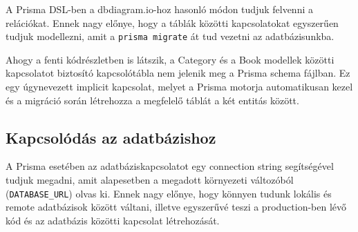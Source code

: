 A Prisma DSL-ben a dbdiagram.io-hoz hasonló módon tudjuk felvenni a relációkat. Ennek nagy előnye, hogy a táblák közötti kapcsolatokat
egyszerűen tudjuk modellezni, amit a \lstinline|prisma migrate| át tud vezetni az adatbázisunkba.

Ahogy a fenti kódrészletben is látszik, a Category és a Book modellek közötti kapcsolatot biztosító kapcsolótábla nem jelenik
meg a Prisma schema fájlban. Ez egy úgynevezett implicit kapcsolat, melyet a Prisma motorja automatikusan kezel és a migráció során
létrehozza a megfelelő táblát a két entitás között.

\subsection{Kapcsolódás az adatbázishoz}
A Prisma esetében az adatbáziskapcsolatot egy connection string segítségével tudjuk megadni, amit alapesetben
a megadott környezeti változóból (\lstinline|DATABASE_URL|) olvas ki. Ennek nagy előnye, hogy könnyen tudunk lokális
és remote adatbázisok között váltani, illetve egyszerűvé teszi a production-ben lévő kód és az adatbázis közötti
kapcsolat létrehozását.
